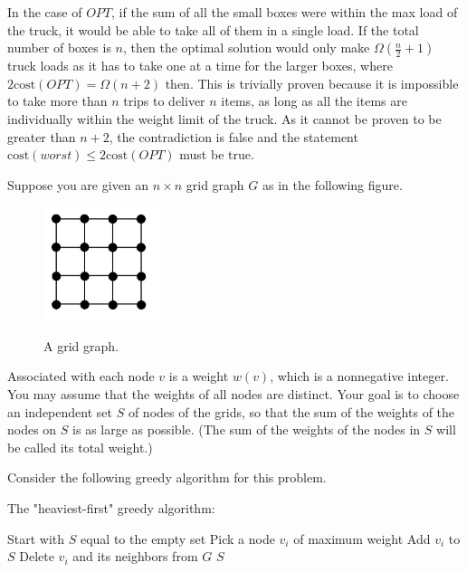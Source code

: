 \documentclass[addpoints]{exam}
\newcommand{\BigOmega}[1]{\Omega\left( #1\right)}
\begin{document}
\begin{questions}
\begin{parts}
\begin{solution}
In the case of $OPT$, if the sum of all the small boxes were within the max load of the truck, it would be able to take all of them in a single load. If the total number of boxes is $n$, then the optimal solution would only make $\BigOmega{\frac{n}{2}+1}$ truck loads as it has to take one at a time for the larger boxes, where $2\text{cost}(OPT) = \BigOmega{n+2}$ then. This is trivially proven because it is impossible to take more than $n$ trips to deliver $n$ items, as long as all the items are individually within the weight limit of the truck. As it cannot be proven to be greater than $n+2$, the contradiction is false and the statement $\text{cost}(worst) \leq 2\text{cost}(OPT)$  must be true.

\end{solution}
  
  
\end{parts}





   Suppose you are given an $n\times n$ grid graph $G$ as in the following figure.

\begin{figure}[H]
  \centering
  \includegraphics[width=0.3\textwidth]{fig1.pdf}\\
  \caption{A grid graph.}
\label{fig:nxn}
\end{figure}

Associated with each node $v$ is a weight $w(v)$, which is a nonnegative integer. You may assume that the weights of all nodes are distinct.
Your goal is to choose an independent set $S$ of nodes of the grids, so that the sum of the weights of the nodes on $S$ is as large as possible.
(The sum of the weights of the nodes in $S$ will be called its total weight.)


Consider the following greedy algorithm for this problem.
\begin{algorithm*} %
\caption{The "heaviest-first" greedy algorithm:} %
\begin{algorithmic} %
\STATE Start with $S$ equal to the empty set
\STATE Pick a node $v_i$ of maximum weight
\STATE Add $v_i$ to $S$
\STATE Delete $v_i$ and its neighbors from $G$
\ENDWHILE
\RETURN $S$
\end{algorithmic}
\label{alg:Heavy}
\end{algorithm*}




\end{questions}
\end{document}
